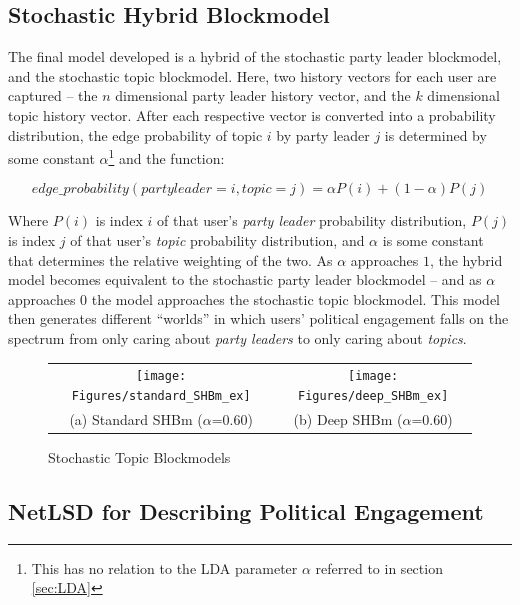 \subsection{Stochastic Hybrid Blockmodel}\label{sec:SHBM}

The final model developed is a hybrid of the stochastic party leader blockmodel,
and the stochastic topic blockmodel. Here, two history vectors for each user are
captured -- the $n$ dimensional party leader history vector, and the $k$
dimensional topic history vector. After each respective vector is converted into
a probability distribution, the edge probability of topic $i$ by party leader
$j$ is determined by some constant $\alpha$\footnote{This has no relation to the
LDA parameter $\alpha$ referred to in section \ref{sec:LDA}} and the function:

\begin{equation}
    edge\_probability(party leader=i, topic=j)=\alpha P(i)+(1-\alpha)P(j)
\end{equation}

Where $P(i)$ is index $i$ of that user's \emph{party leader} probability
distribution, $P(j)$ is index $j$ of that user's \emph{topic} probability
distribution, and $\alpha$ is some constant that determines the relative
weighting of the two. As $\alpha$ approaches $1$, the hybrid model becomes
equivalent to the stochastic party leader blockmodel -- and as $\alpha$
approaches $0$ the model approaches the stochastic topic blockmodel. This model
then generates different ``worlds'' in which users' political engagement falls
on the spectrum from only caring about \emph{party leaders} to only caring about
\emph{topics}.

\begin{singlespacing}
    \begin{figure}
        \centering
        \begin{tabular}{cc}
          \texttt{[image: Figures/standard\_SHBm\_ex]} &
          \texttt{[image: Figures/deep\_SHBm\_ex]} \\
        (a) Standard SHBm ($\alpha$=0.60) & (b) Deep SHBm ($\alpha$=0.60)\\[6pt]
        \end{tabular}
        \caption[Stochastic Topic Blockmodels]{Stochastic Topic Blockmodels}
        \label{fig:SHBm_examples}
    \end{figure}
\end{singlespacing}

\subsection{NetLSD for Describing Political Engagement}\label{sec:NetLSDForSBM}

